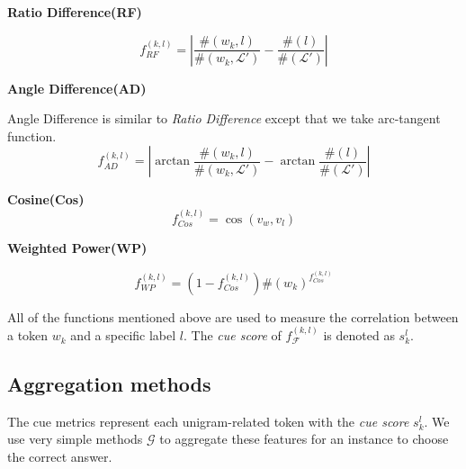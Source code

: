 \noindent\textbf{Ratio Difference(RF)}

\begin{equation}
    f_{RF}^{(k,l)} = \left|\frac{\#(w_k, l)}{\#(w_k, \mathcal{L'})} -
    \frac{\#(l)}{\#(\mathcal{L'})}\right|
\end{equation}

\noindent\textbf{Angle Difference(AD)}

Angle Difference is similar to \textit{Ratio Difference} except that we take arc-tangent function.
\begin{equation}
    f_{AD}^{(k,l)} = \left| \arctan\frac{\#(w_k, l)}{\#(w_k, \mathcal{L'})} -
    \arctan \frac{\#(l)}{\#(\mathcal{L'})} \right|
\end{equation}

\noindent\textbf{Cosine(Cos)}
\begin{equation}
    f_{Cos}^{(k,l)} = \cos(v_w, v_l)
\end{equation}

\noindent\textbf{Weighted Power(WP)}

\begin{equation}
    f_{WP}^{(k,l)} = (1-f_{Cos}^{(k,l)})\#(w_k)^{f_{Cos}^{(k,l)}}
\end{equation}

All of the functions mentioned above are used to measure the correlation between a token $w_k$ and a specific label $l$. The \textit{cue score} of $f_{\mathcal{F}}^{(k,l)}$ is denoted as $s^{l}_k$.

\subsection{Aggregation methods}

The cue metrics represent each unigram-related token with the \textit{cue score} $s^{l}_k$. 
We use very simple methods $\mathcal{G}$  to aggregate these features for an instance to choose 
the correct answer.

